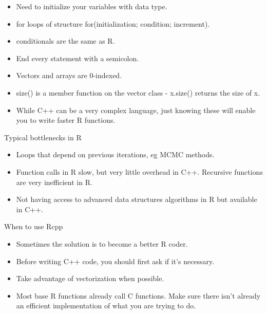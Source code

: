 \documentclass{beamer}\usepackage[]{graphicx}\usepackage[]{color}
\begin{document}
\begin{frame}[fragile]{}
    \vspace{0.5em}
    \begin{itemize}\itemsep1em
        \item Need to initialize your variables with data type.
        \item for loops of structure for(initialization; condition; increment).
        \item conditionals are the same as R.
        \item End every statement with a semicolon.
        \item Vectors and arrays are 0-indexed.
        \item size() is a member function on the vector class - x.size()
            returns the size of x.
        \item While C++ can be a very complex language, just knowing these
            will enable you to write faster R functions.
    \end{itemize}
\end{frame}
\begin{frame}[fragile]{Typical bottlenecks in R}
    \vspace{0.5em}
    \begin{itemize}\itemsep1em
        \item Loops that depend on previous iterations, eg MCMC methods.
        \item Function calls in R slow, but very little overhead in C++.
            Recursive functions are very inefficient in R.
        \item Not having access to advanced data structures algorithms in R
             but available in C++.
    \end{itemize}
\end{frame}
\begin{frame}[fragile]{When to use Rcpp}
    \vspace{0.5em}
    \begin{itemize}\itemsep1em
        \item Sometimes the solution is to become a better R coder.
        \item Before writing C++ code, you should first ask if it's necessary.
        \item Take advantage of vectorization when possible.
        \item Most base R functions already call C functions. Make sure there
            isn't already an efficient implementation of what you are trying
            to do.
    \end{itemize}
\end{frame}
\end{document}
